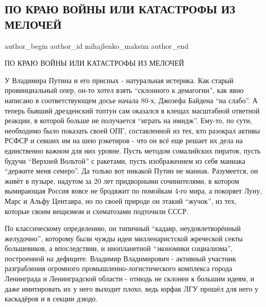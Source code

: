  
 
 
 
 
 
\subsection{ПО КРАЮ ВОЙНЫ ИЛИ КАТАСТРОФЫ ИЗ МЕЛОЧЕЙ}
\label{sec:07_12_2021.fb.mihajlenko_maksim.1.po_kraju_vojny}
 
\ifcmt
 author_begin
   author_id mihajlenko_maksim
 author_end
\fi

ПО КРАЮ ВОЙНЫ ИЛИ КАТАСТРОФЫ ИЗ МЕЛОЧЕЙ

У Владимира Путина и его присных - натуральная истерика. Как старый
провинциальный опер, он-то хотел взять \enquote{склонного к демагогии}, как явно
написано в соответствующем досье начала 80-х, Джозефа Байдена \enquote{на слабо}. А
теперь бывший дрезденский топтун сам оказался в клещах масштабной ответной
реакции, в которой больше не получается \enquote{играть на имидж}. Ему-то, по сути,
необходимо было показать своей ОПГ, составленной из тех, кто разокрал активы
РСФСР и севших им на шею рэкетиров - что он всё еще решает их дела на
единственно важном для них уровне. Пусть методом сомалийских пиратов, пусть
будучи \enquote{Верхней Вольтой} с ракетами, пусть изображением из себя маниака
\enquote{держите меня семеро}.  Да только вот никакой Путин не маниак. Разумеется, он
живёт в пузыре, надутом за 20 лет придворными сочинителями, в котором
вымирающая Россия вовсе не бродяжит по помойкам 4-го мира, а покоряет Луну,
Марс и Альфу Центавра, но по своей природе он этакий \enquote{жучок}, из тех, которые
своим вещизмом и схематозами подточили СССР. 

По классическому определению, он типичный \enquote{кадавр, неудовлетворённый
желудочно}, которому были чужды идеи милленаристской жреческой секты
большевиков, а впоследствии, и инопланетной \enquote{экономики социализма}, построенной
на дефиците. Владимир Владимирович - активный участник разграбления огромного
промышленно-логистического комплекса города Ленинграда и Ленинградской области
- отнюдь не склонен к большим идеям, и даже имитировать их у него выходит
плохо, ведь юрфак ЛГУ прошёл для него у каскадёров и в секции дзюдо.  

